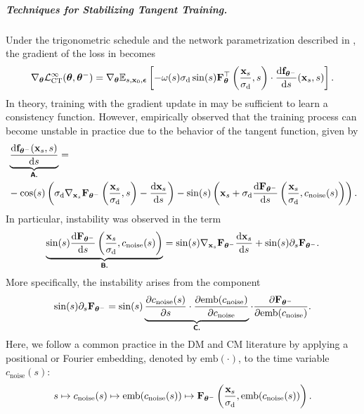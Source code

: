 \subparagraph{Techniques for Stabilizing Tangent Training.}
Under the trigonometric schedule and the network parametrization described in , the gradient of the loss in  becomes
\begin{align}\label{eq:conti-ct-loss-trig}
    \nabla_{\bm{\theta}}\mathcal{L}^\infty_{\text{CT}}(\bm{\theta},\bm{\theta}^-)  =\nabla_{\bm{\theta}} \mathbb{E}_{s, {\mathbf{x}}_0, \bm{\epsilon}} \left[ -\omega(s) \sigma_{\mathrm{d}} \sin(s) {\mathbf{F}}_{\bm{\theta}}^\top\left( \frac{{\mathbf{x}}_s}{\sigma_{\mathrm{d}}}, s \right) \cdot \frac{\mathop{}\!\mathrm{d} {\mathbf{f}}_{\bm{\theta}^-}}{\mathop{}\!\mathrm{d} s} ({\mathbf{x}}_s, s) \right].
\end{align}
 In theory, training with the gradient update in  may be sufficient to learn a consistency function. However, \citet{lu2024simplifying} empirically observed that the training process can become unstable in practice due to the behavior of the tangent function, given by
\begin{align*}
&\underbrace{\frac{\mathop{}\!\mathrm{d} {\mathbf{f}}_{\bm{\theta}^-}({\mathbf{x}}_s, s)}{\mathop{}\!\mathrm{d} s}}_{\text{{\sffamily\textbf{A.}}}}
= \\&-\cos(s) \left( \sigma_{\mathrm{d}} \nabla_{{\mathbf{x}}_s} {\mathbf{F}}_{\bm{\theta}^-}\left( \frac{{\mathbf{x}}_s}{\sigma_{\mathrm{d}}}, s \right) - \frac{\mathop{}\!\mathrm{d} {\mathbf{x}}_s}{\mathop{}\!\mathrm{d} s} \right) - \sin(s) \left( {\mathbf{x}}_s + \sigma_{\mathrm{d}} \frac{\mathop{}\!\mathrm{d} {\mathbf{F}}_{\bm{\theta}^-}}{\mathop{}\!\mathrm{d} s}\left( \frac{{\mathbf{x}}_s}{\sigma_{\mathrm{d}}}, c_{\mathrm{noise}}(s) \right) \right).
\end{align*}
In particular, instability was observed in the term
\begin{align*}
\underbrace{\sin(s) \frac{\mathop{}\!\mathrm{d} {\mathbf{F}}_{\bm{\theta}^-}}{\mathop{}\!\mathrm{d} s}\left( \frac{{\mathbf{x}}_s}{\sigma_{\mathrm{d}}}, c_{\mathrm{noise}}(s) \right)}_{\text{{\sffamily\textbf{B.}}}}
= \sin(s) \nabla_{{\mathbf{x}}_s} {\mathbf{F}}_{\bm{\theta}^-} \frac{\mathop{}\!\mathrm{d} {\mathbf{x}}_s}{\mathop{}\!\mathrm{d} s}
+ \sin(s) \partial_s {\mathbf{F}}_{\bm{\theta}^-}.
\end{align*}
More specifically, the instability arises from the component
\begin{align}\label{eq:ds-decomposition}
        \sin(s) \partial_s {\mathbf{F}}_{\bm{\theta}^-} = \sin(s) \underbrace{\frac{\partial c_{\mathrm{noise}}(s)}{\partial s} \cdot \frac{\partial \text{emb}(c_{\mathrm{noise}})}{\partial c_{\mathrm{noise}}}}_{\text{{\sffamily\textbf{C.}}}} \cdot \frac{\partial {\mathbf{F}}_{\bm{\theta}^-}}{\partial \text{emb}(c_{\mathrm{noise}})}.
\end{align}
Here, we follow a common practice in the DM and CM literature by applying a positional or Fourier embedding, denoted by $\text{emb}(\cdot)$, to the time variable $c_{\mathrm{noise}}(s)$:
\[
s \mapsto c_{\mathrm{noise}}(s) \mapsto \text{emb}(c_{\mathrm{noise}}(s)) \mapsto {\mathbf{F}}_{\bm{\theta}^-}\left( \frac{{\mathbf{x}}_s}{\sigma_{\mathrm{d}}}, \text{emb}(c_{\mathrm{noise}}(s)) \right).
\]


